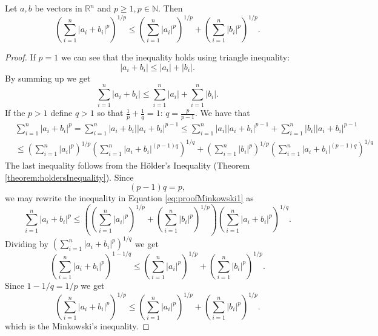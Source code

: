 	\begin{theorem}
		\label{theorem:minkowskiInequality}
		Let $a,b$ be vectors in $\mathbb{R}^n$ and $p \ge 1, p \in \mathbb{N}$. Then
		\begin{equation}
		{\left( \sum_{i=1}^{n}|a_i + b_i|^p \right)}^{1/p} \le {\left( \sum_{i=1}^{n}|a_i|^p \right)}^{1/p} + {\left( \sum_{i=1}^{n}|b_i|^p \right)}^{1/p}.
		\end{equation}
		\begin{proof}
			If $p=1$ we can see that the inequality holds using triangle inequality:
			\begin{equation*}
			|a_i+b_i| \le |a_i|+|b_i|.
			\end{equation*}
			By summing up we get
			\begin{equation*}
			\sum_{i=1}^{n}|a_i + b_i| \le  \sum_{i=1}^{n}|a_i| + \sum_{i=1}^{n}|b_i|.
			\end{equation*}
			If the $p > 1$ define $q > 1$ so that  $\frac{1}{p}+\frac{1}{q}=1$: $q = \frac{p}{p-1}$. We have that 
			\begin{equation}
			\label{eq:proofMinkowski1}
			\begin{split}
			& \sum_{i=1}^{n}|a_i + b_i|^p = \sum_{i=1}^{n}|a_i + b_i||a_i + b_i|^{p-1} \le \sum_{i=1}^{n}|a_i||a_i + b_i|^{p-1} + \sum_{i=1}^{n}|b_i||a_i + b_i|^{p-1}  \\
			& \le 	{\left( \sum_{i=1}^{n}|a_i|^p \right)}^{1/p} {\left( \sum_{i=1}^{n}|a_i+b_i|^{(p-1)q} \right)}^{1/q} + {\left( \sum_{i=1}^{n}|b_i|^p \right)}^{1/p} {\left( \sum_{i=1}^{n}|a_i+b_i|^{(p-1)q} \right)}^{1/q}
			\end{split}
			\end{equation}
			The last inequality follows from the H\"older's Inequality (Theorem \ref{theorem:holdersInequality}). Since 
			\begin{equation*}
			(p-1)q = p,
			\end{equation*}
			we may rewrite the inequality in Equation \ref{eq:proofMinkowski1} as 
			\begin{equation}
			\sum_{i=1}^{n}|a_i + b_i|^p \le
			{\left({\left( \sum_{i=1}^{n}|a_i|^p \right)}^{1/p} + {\left( \sum_{i=1}^{n}|b_i|^p \right)}^{1/p}\right)} {\left( \sum_{i=1}^{n}|a_i+b_i|^{p} \right)}^{1/q}.
			\end{equation}
			Dividing by ${\left( \sum_{i=1}^{n}|a_i+b_i|^{p} \right)}^{1/q}$ we get
			\begin{equation}
			{\left( \sum_{i=1}^{n}|a_i+b_i|^{p} \right)}^{1-1/q} \le {\left( \sum_{i=1}^{n}|a_i|^p \right)}^{1/p} + {\left( \sum_{i=1}^{n}|b_i|^p \right)}^{1/p}.
			\end{equation}
			Since $1-1/q = 1/p$ we get 
			\begin{equation}
			{\left( \sum_{i=1}^{n}|a_i+b_i|^{p} \right)}^{1/p} \le {\left( \sum_{i=1}^{n}|a_i|^p \right)}^{1/p} + {\left( \sum_{i=1}^{n}|b_i|^p \right)}^{1/p}.
			\end{equation}
			which is the Minkowski's inequality.
		\end{proof}
	\end{theorem}
